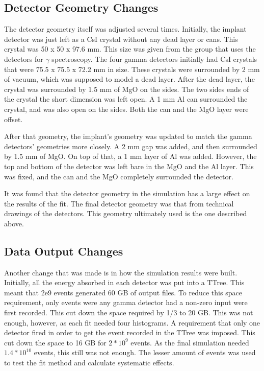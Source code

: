 \documentclass[../MaxHughesThesis.tex]{subfiles}
\begin{document}
\subsection{Detector Geometry Changes}
The detector geometry itself was adjusted several times.
Initially, the implant detector was just left as a CsI crystal without any dead layer or cans.
This crystal was 50 x 50 x 97.6 mm.
This size was given from the group that uses the detectors for $\gamma$ spectroscopy.
The four gamma detectors initially had CsI crystals that were 75.5 x 75.5 x 72.2 mm in size.
These crystals were surrounded by 2 mm of vacuum, which was supposed to model a dead layer.
After the dead layer, the crystal was surrounded by 1.5 mm of MgO on the sides.
The two sides ends of the crystal the short dimension was left open.
A 1 mm Al can surrounded the crystal, and was also open on the sides.
Both the can and the MgO layer were offset.

After that geometry, the implant's geometry was updated to match the gamma detectors' geometries more closely.
A 2 mm gap was added, and then surrounded by 1.5 mm of MgO. 
On top of that, a 1 mm layer of Al was added.
However, the top and bottom of the detector was left bare in the MgO and the Al layer.
This was fixed, and the can and the MgO completely surrounded the detector.

It was found that the detector geometry in the simulation has a large effect on the results of the fit.
The final detector geometry was that from technical drawings of the detectors.
This geometry ultimately used  is the one described above. 

\subsection{Data Output Changes}
Another change that was made is in how the simulation results were built.
Initially, all the energy absorbed in each detector was put into a TTree.
This meant that 2e9 events generated 60 GB of output files.
To reduce this space requirement, only events were any gamma detector had a non-zero input were first recorded.
This cut down the space required by 1/3 to 20 GB.
This was not enough, however, as each fit needed four histograms.
A requirement that only one detector fired in order to get the event recorded in the TTree was imposed. 
This cut down the space to 16 GB for $2 * 10^{9}$ events.
As the final simulation needed $1.4 * 10^{10}$ events, this still was not enough.
The lesser amount of events was used to test the fit method and calculate systematic effects.
\end{document}
